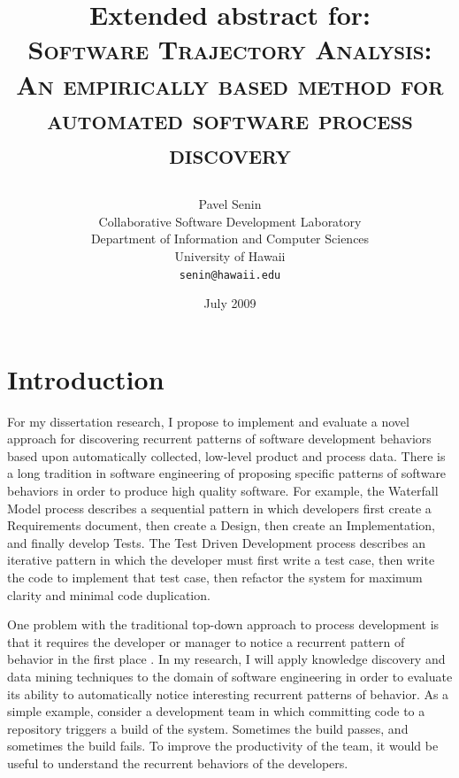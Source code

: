 \documentclass[11pt,oneside]{article}
\begin{document}
\title{Extended abstract for: \\
       \textsc{Software Trajectory Analysis:} \\
       \textsc{An empirically based method for automated software process discovery} \\
       \author{Pavel Senin \\
							 Collaborative Software Development Laboratory \\
							 Department of Information and Computer Sciences \\
							 University of Hawaii \\
         \texttt{senin@hawaii.edu}
       }
       \date{July 2009}
}
\maketitle



\section{Introduction}
For my dissertation research, I propose to implement and evaluate a novel approach for discovering recurrent patterns of software development behaviors based upon automatically collected, low-level product and process data. There is a long tradition in software engineering of proposing specific patterns of software behaviors in order to produce high quality software. For example, the Waterfall Model process describes a sequential pattern in which developers first create a Requirements document, then create a Design, then create an Implementation, and finally develop Tests. The Test Driven Development process describes an iterative pattern in which the developer must first write a test case, then write the code to implement that test case, then refactor the system for maximum clarity and minimal code duplication.

One problem with the traditional top-down approach to process development is that it requires the developer or manager to notice a recurrent pattern of behavior in the first place \cite{citeulike:5043104}. In my research, I will apply knowledge discovery and data mining techniques to the domain of software engineering in order to evaluate its ability to automatically notice interesting recurrent patterns of behavior. As a simple example, consider a development team in which committing code to a repository triggers a build of the system. Sometimes the build passes, and sometimes the build fails. To improve the productivity of the team, it would be useful to understand the recurrent behaviors of the developers. 
\end{document}
